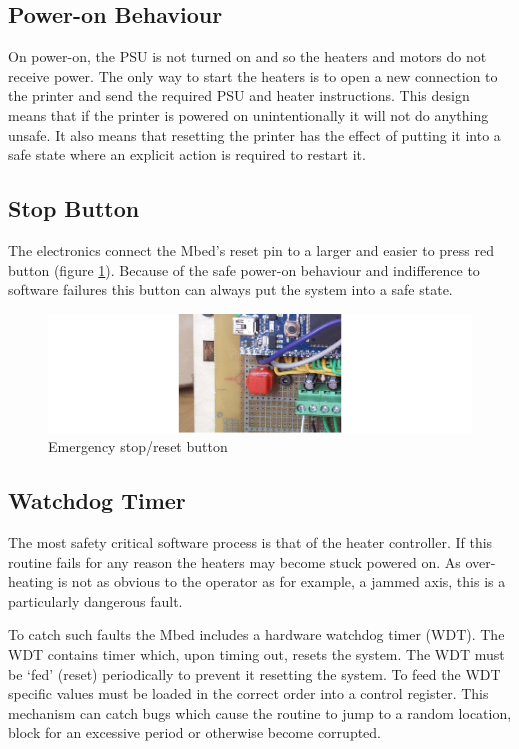 		\subsection{Power-on Behaviour}
			
			On power-on, the PSU is not turned on and so the heaters and motors do not
			receive power. The only way to start the heaters is to open a new
			connection to the printer and send the required PSU and heater
			instructions. This design means that if the printer is powered on
			unintentionally it will not do anything unsafe. It also means that
			resetting the printer has the effect of putting it into a safe state where
			an explicit action is required to restart it.
		
		\subsection{Stop Button}
			
			The electronics connect the Mbed's reset pin to a larger and easier to
			press red button (figure \ref{fig:stop}). Because of the safe power-on
			behaviour and indifference to software failures this button can always put
			the system into a safe state.
			
			\begin{figure}
				\includegraphics[width=1\textwidth]{diagrams/stop.pdf}
				\caption{Emergency stop/reset button}
				\label{fig:stop}
			\end{figure}
		
		\subsection{Watchdog Timer}
			
			The most safety critical software process is that of the heater
			controller. If this routine fails for any reason the heaters may become
			stuck powered on. As over-heating is not as obvious to the operator as for
			example, a jammed axis, this is a particularly dangerous fault.
			
			To catch such faults the Mbed includes a hardware watchdog timer (WDT).
			The WDT contains timer which, upon timing out, resets the system. The WDT
			must be `fed' (reset) periodically to prevent it resetting the system. To
			feed the WDT specific values must be loaded in the correct order into a
			control register. This mechanism can catch bugs which cause the routine to
			jump to a random location, block for an excessive period or otherwise
			become corrupted.
			
